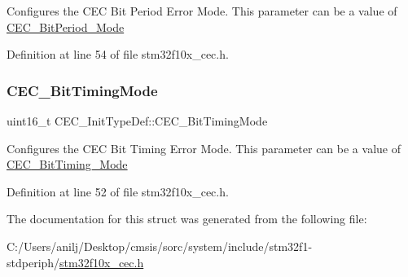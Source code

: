 Configures the C\+EC Bit Period Error Mode. This parameter can be a value of \hyperlink{group___c_e_c___bit_period___mode}{C\+E\+C\+\_\+\+Bit\+Period\+\_\+\+Mode} 

Definition at line 54 of file stm32f10x\+\_\+cec.\+h.

\mbox{\label{struct_c_e_c___init_type_def_a197bc5a8957ab0b86d4ecc1347fa9e37}} 
\subsubsection{\texorpdfstring{C\+E\+C\+\_\+\+Bit\+Timing\+Mode}{CEC\_BitTimingMode}}
{\footnotesize\ttfamily uint16\+\_\+t C\+E\+C\+\_\+\+Init\+Type\+Def\+::\+C\+E\+C\+\_\+\+Bit\+Timing\+Mode}

Configures the C\+EC Bit Timing Error Mode. This parameter can be a value of \hyperlink{group___c_e_c___bit_timing___mode}{C\+E\+C\+\_\+\+Bit\+Timing\+\_\+\+Mode} 

Definition at line 52 of file stm32f10x\+\_\+cec.\+h.



The documentation for this struct was generated from the following file\+:\begin{DoxyCompactItemize}
\item 
C\+:/\+Users/anilj/\+Desktop/cmsis/sorc/system/include/stm32f1-\/stdperiph/\hyperlink{stm32f10x__cec_8h}{stm32f10x\+\_\+cec.\+h}\end{DoxyCompactItemize}
